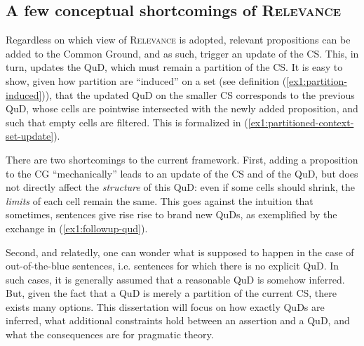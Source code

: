 \subsection{A few conceptual shortcomings of \textsc{Relevance}}

Regardless on which view of \textsc{Relevance} is adopted, relevant propositions can be added to the Common Ground, and as such, trigger an update of the CS. This, in turn, updates the QuD, which must remain a partition of the CS. It is easy to show, given how partition are ``induced'' on a set (see definition (\ref{ex1:partition-induced})), that the updated QuD on the smaller CS corresponds to the previous QuD, whose cells are pointwise intersected with the newly added proposition, and such that empty cells are filtered. This is formalized in (\ref{ex1:partitioned-context-set-update}).

\begin{exe}
	\label{ex1:partitioned-context-set-update}
\end{exe}

There are two shortcomings to the current framework. First, adding a proposition to  the CG ``mechanically'' leads to an update of the CS and of the QuD, but does not directly affect the \textit{structure} of this QuD: even if some cells should shrink, the \textit{limits} of each cell remain the same. This goes against the intuition that sometimes, sentences give rise rise to brand new QuDs, as exemplified by the exchange in (\ref{ex1:followup-qud}).

\begin{exe}
	\label{ex1:followup-qud}
\end{exe}


Second, and relatedly, one can wonder what is supposed to happen in the case of out-of-the-blue sentences, i.e. sentences for which there is no explicit QuD. In such cases, it is generally assumed that a reasonable QuD is somehow inferred. But, given the fact that a QuD is merely a partition of the current CS, there exists many options. This dissertation will focus on how exactly QuDs are inferred, what additional constraints hold between an assertion and a QuD, and what the consequences are for pragmatic theory.

